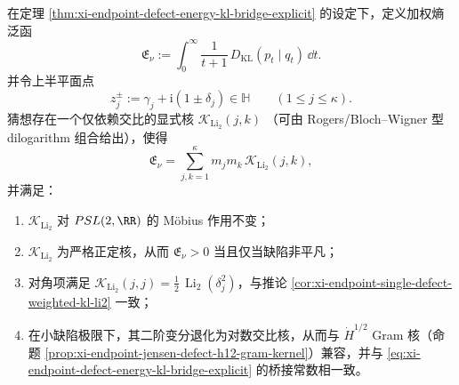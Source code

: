 \begin{conjecture}\label{conj:xi-endpoint-multidefect-dilogarithm-crossratio-kernel}
在定理 \ref{thm:xi-endpoint-defect-energy-kl-bridge-explicit} 的设定下，定义加权熵泛函
\[
\mathfrak E_\nu:=\int_0^\infty \frac{1}{t+1}\,D_{\mathrm{KL}}(p_t\mid q_t)\,\dd t.
\]
并令上半平面点
\[
z_j^\pm:=\gamma_j+\mathrm{i}(1\pm\delta_j)\in\mathbb H\qquad(1\le j\le\kappa).
\]
猜想存在一个仅依赖交比的显式核 \(\mathcal K_{\operatorname{Li}_2}(j,k)\)
（可由 Rogers/Bloch--Wigner 型 dilogarithm 组合给出），使得
\[
\mathfrak E_\nu=\sum_{j,k=1}^{\kappa}m_jm_k\,\mathcal K_{\operatorname{Li}_2}(j,k),
\]
并满足：
\begin{enumerate}
  \item \(\mathcal K_{\operatorname{Li}_2}\) 对 \(PSL(2,\RR)\) 的 Möbius 作用不变；
  \item \(\mathcal K_{\operatorname{Li}_2}\) 为严格正定核，从而 \(\mathfrak E_\nu>0\) 当且仅当缺陷非平凡；
  \item 对角项满足 \(\mathcal K_{\operatorname{Li}_2}(j,j)=\frac12\,\operatorname{Li}_2(\delta_j^2)\)，与推论 \ref{cor:xi-endpoint-single-defect-weighted-kl-li2} 一致；
  \item 在小缺陷极限下，其二阶变分退化为对数交比核，从而与 \( \dot H^{1/2} \) Gram 核（命题 \ref{prop:xi-endpoint-jensen-defect-h12-gram-kernel}）兼容，并与 \eqref{eq:xi-endpoint-defect-energy-kl-bridge-explicit} 的桥接常数相一致。
\end{enumerate}
\end{conjecture}

\endinput

